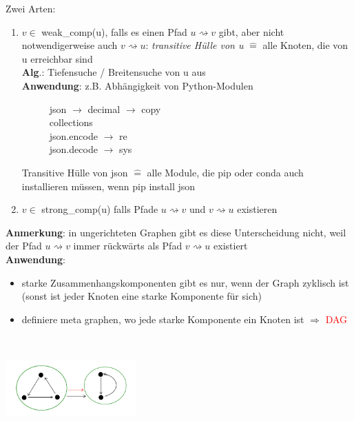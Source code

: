     Zwei Arten:
    \begin{enumerate}
        \item $v \in$ weak\_comp(u), falls es einen Pfad $u \rightsquigarrow v$ gibt, aber nicht notwendigerweise auch $v \rightsquigarrow u$: \emph{transitive Hülle von u} $\widehat{=}$ alle Knoten, die von u erreichbar sind\\
        \textbf{Alg}.: Tiefensuche / Breitensuche von u aus \\
        \textbf{Anwendung}: z.B. Abhängigkeit von Python-Modulen

        \begin{figure}[htbp]
            \hspace*{2cm}json $\rightarrow$ decimal $\rightarrow$ copy \\
            \hspace*{5cm}  collections\\
            \hspace*{3cm}  json.encode \raisebox{-1.5mm}{$\searrow$} \hspace*{-5mm}$\rightarrow$ re\\
            \hspace*{3cm}  json.decode \raisebox{2mm}{$\nearrow$} \hspace*{-6mm} $\rightarrow$ sys
        \end{figure}
        Transitive Hülle von json $\widehat{=}$ alle Module, die pip oder conda auch installieren müssen, wenn \glqq pip install json\grqq
        \item $v \in$ strong\_comp(u) falls Pfade $u \rightsquigarrow v$ und $v \rightsquigarrow u$ existieren
    \end{enumerate}
    \textbf{Anmerkung}: in ungerichteten Graphen gibt es diese Unterscheidung nicht, weil der Pfad $u \rightsquigarrow v$ immer rückwärts als Pfad $v \rightsquigarrow u$ existiert\\

    \textbf{Anwendung}:
    \begin{itemize}
        \item starke Zusammenhangskomponenten gibt es nur, wenn der Graph zyklisch ist (sonst ist jeder Knoten eine starke Komponente für sich)
        \item definiere \glqq meta graphen\grqq , wo jede starke Komponente ein Knoten ist $\Rightarrow$ \textcolor{red}{DAG}
    \end{itemize}
    \includegraphics[width=5cm,height=4cm,keepaspectratio]{./Pictures/metagraph.png}\\

